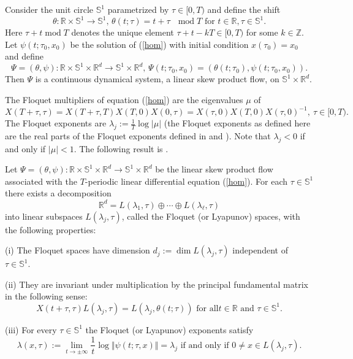 \documentclass{siamltex}%
\begin{document}
Consider the unit circle $\mathbb{S}^{1}$ parametrized by $\tau\in\lbrack0,T)$
and define the shift%
\[
\theta:\mathbb{R}\times\mathbb{S}^{1}\rightarrow\mathbb{S}^{1},\,\theta
(t;\tau)=t+\tau\text{ }\operatorname{mod}T\text{ for }t\in\mathbb{R}%
,\tau\mathbb{\in S}^{1}.
\]
Here $\tau+t\operatorname{mod}T$ denotes the unique element $\tau
+t-kT\in\lbrack0,T)$ for some $k\in\mathbb{Z}$. Let $\psi(t;\tau_{0},x_{0})$
be the solution of (\ref{hom}) with initial condition $x(\tau_{0})=x_{0}$ and
define%
\begin{equation}
\Psi=(\theta,\psi):\mathbb{R}\times\mathbb{S}^{1}\times\mathbb{R}%
^{d}\rightarrow\mathbb{S}^{1}\times\mathbb{R}^{d},\,\Psi(t;\tau_{0}%
,x_{0})=(\theta(t;\tau_{0}),\psi(t;\tau_{0},x_{0})). \label{aug_hom}%
\end{equation}
Then $\Psi$ is a continuous dynamical system, a linear skew product flow, on
$\mathbb{S}^{1}\times\mathbb{R}^{d}$.

The Floquet multipliers of equation (\ref{hom}) are the eigenvalues $\mu$ of
\[
X(T+\tau,\tau)=X(T+\tau,T)X(T,0)X(0,\tau)=X(\tau,0)X(T,0)X(\tau,0)^{-1}%
,~\tau\in\lbrack0,T).
\]
The Floquet exponents are $\lambda_{j}:=\frac{1}{T}\log\left\vert
\mu\right\vert $ (the Floquet exponents as defined here are the real parts of
the Floquet exponents defined in \cite{Chic99} and \cite{Tes}). Note that
$\lambda_{j}<0$ if and only if $\left\vert \mu\right\vert <1$. The following
result is \cite[Theorem 7.2.9]{ColK14}.

\begin{theorem}
\label{Theorem7.1.7}Let $\Psi=(\theta,\psi):\mathbb{R}\times\mathbb{S}%
^{1}\times\mathbb{R}^{d}\longrightarrow\mathbb{S}^{1}\times\mathbb{R}^{d}$ be
the linear skew product flow associated with the $T$-periodic linear
differential equation (\ref{hom}). For each $\tau\in\mathbb{S}^{1}$ there
exists a decomposition%
\[
\mathbb{R}^{d}=L(\lambda_{1},\tau)\oplus\cdots\oplus L(\lambda_{\ell},\tau)
\]
into linear subspaces $L(\lambda_{j},\tau)$, called the Floquet (or Lyapunov)
spaces, with the following properties:

(i) The Floquet spaces have dimension $d_{j}:=\dim L(\lambda_{j},\tau)$
independent of $\tau\in\mathbb{S}^{1}$.

(ii) They are invariant under multiplication by the principal fundamental
matrix in the following sense:
\[
X(t+\tau,\tau)L(\lambda_{j},\tau)=L(\lambda_{j},\theta(t;\tau))\text{ for all
}t\in\mathbb{R}\text{ and }\tau\in\mathbb{S}^{1}.
\]


(iii) For every $\tau\in\mathbb{S}^{1}$ the Floquet (or Lyapunov) exponents
satisfy%
\[
\lambda(x,\tau):=\lim_{t\rightarrow\pm\infty}\frac{1}{t}\log\Vert\psi
(t;\tau,x)\Vert=\lambda_{j}\text{ if and only if }0\not =x\in L(\lambda
_{j},\tau).
\]

\end{theorem}
\end{document}
